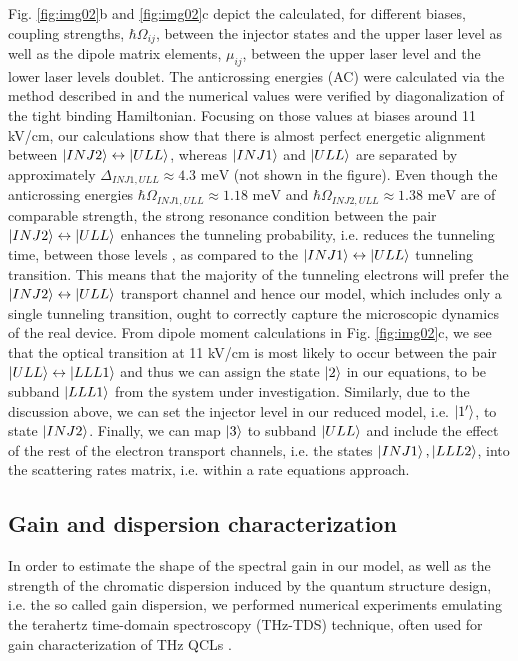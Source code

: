 \documentclass[10pt,letterpaper]{article}
\begin{document}
{Fig. \ref{fig:img02}b and \ref{fig:img02}c depict the calculated, for different biases, coupling strengths, $\hbar \Omega_{ij}$, between the injector states and the upper laser level as well as the dipole matrix elements, $\mu_{ij}$, between the upper laser level and the lower laser levels doublet. The anticrossing energies (AC) were calculated via the method described in \cite{bastardwave} and the numerical values were verified by diagonalization of the tight binding Hamiltonian. Focusing on those values at biases around 11 kV/cm, our calculations show that there is almost perfect energetic alignment between $\Ket{INJ2} \leftrightarrow \Ket{ULL}$, whereas $\Ket{INJ1}$ and $\Ket{ULL}$ are separated by approximately $\Delta_{INJ1,ULL} \approx 4.3 \text{ meV}$ (not shown in the figure). Even though the anticrossing energies $\hbar \Omega_{INJ1,ULL} \approx 1.18 \text{ meV}$ and $\hbar \Omega_{INJ2,ULL} \approx 1.38 \text{ meV}$ are of comparable strength, the strong resonance condition between the pair $\Ket{INJ2} \leftrightarrow \Ket{ULL}$ enhances the tunneling probability, i.e. reduces the tunneling time, between those levels \cite{williams2007terahertz}, as compared to the $\Ket{INJ1} \leftrightarrow \Ket{ULL}$ tunneling transition. This means that the majority of the tunneling electrons will prefer the $\Ket{INJ2} \leftrightarrow \Ket{ULL}$ transport channel and hence our model, which includes only a single tunneling transition, ought to correctly capture the microscopic dynamics of the real device. From dipole moment calculations in Fig. \ref{fig:img02}c, we see that the optical transition at 11 kV/cm is most likely to occur between the pair $\Ket{ULL} \leftrightarrow \Ket{LLL1}$ and thus we can assign the state $\Ket{2}$ in our equations, to be subband $\Ket{LLL1}$ from the system under investigation. Similarly, due to the discussion above, we can set the injector level in our reduced model, i.e. $\Ket{1'}$, to state $\Ket{INJ2}$. Finally, we can map $\Ket{3}$ to subband $\Ket{ULL}$ and include the effect of the rest of the electron transport channels, i.e. the states $\Ket{INJ1},\Ket{LLL2}$, into the scattering rates matrix, i.e. within a rate equations approach.

\subsection{Gain and dispersion characterization}
\label{subsec:numthztds}
In order to estimate the shape of the spectral gain in our model, as well as the strength of the chromatic dispersion induced by the quantum structure design, i.e. the so called gain dispersion, we performed numerical experiments emulating the terahertz time-domain spectroscopy (THz-TDS) technique, often used for gain characterization of THz QCLs \cite{burghoff2014broadband,jukam2008gain}.

}
\end{document}
